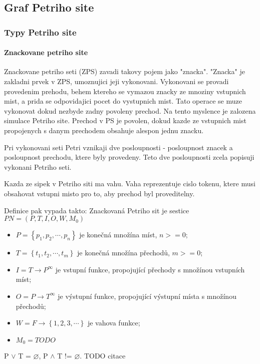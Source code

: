 \subsection*{Graf Petriho site}

\subsubsection{Typy Petriho site}

\paragraph*{Znackovane petriho site}
Znackovane petriho seti (ZPS) zavadi takovy pojem jako "znacka". "Znacka" je zakladni prvek v ZPS, umoznujici jeji vykonovani. Vykonovani se provadi provedenim prehodu, behem ktereho se vymazou znacky ze mnoziny vstupnich mist, a prida se odpovidajici pocet do vystupnich mist. Tato operace se muze vykonovat dokud nezbyde zadny povoleny prechod. Na tento myslence je zalozena simulace Petriho site. Prechod v PS je povolen, dokud kazde ze vstupnich mist propojenych s danym prechodem obsahuje alespon jednu znacku. 

Pri vykonovani seti Petri vznikaji dve posloupnosti - posloupnost znacek a posloupnost prechodu, ktere byly provedeny. Teto dve posloupnosti zcela popisuji vykonani Petriho seti.

Kazda ze sipek v Petriho siti ma vahu. Vaha reprezentuje cislo tokenu, ktere musi obsahovat vstupni misto pro to, aby prechod byl proveditelny.

Definice pak vypada takto:
Znackovaná Petriho sit je sestice $PN = \left(P, T, I, O, W, M_0\right)$
\begin{itemize}
  \item $P = \left\{p_1, p_2, \cdots , p_n\right\}$ je konečná množína míst, $n >= 0$; \\
  \item $T = \left\{t_1, t_2, \cdots , t_m\right\}$ je konečná množína přechodů, $m >= 0$; \\
  \item $I = T \rightarrow P^\infty$ je vstupní funkce, propojující přechody s množínou vstupních míst; \\
  \item $O = P \rightarrow T^\infty$ je výstupní funkce, propojující výstupní místa s množínou přechodů; \\
  \item $W = F \rightarrow \left\{1, 2, 3, \cdots \right\}$ je vahova funkce;
  \item $M_0 = TODO$
\end{itemize}
P $\vee$ T = $\varnothing$, P $\wedge$ T != $\varnothing$. TODO citace

